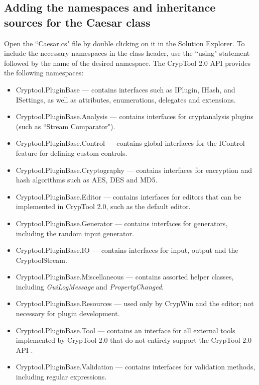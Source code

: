 \subsection{Adding the namespaces and inheritance sources for the Caesar class}
\label{sec:AddingTheNamespacesAndInheritanceSourcesForTheCaesarClass}

Open the ``Caesar.cs" file by double clicking on it in the Solution Explorer. To include the necessary namespaces in the class header, use the ``using" statement followed by the name of the desired namespace. The CrypTool 2.0 API provides the following namespaces:

\begin{itemize}
	\item Cryptool.PluginBase --- contains interfaces such as IPlugin, IHash, and ISettings, as well as attributes, enumerations, delegates and extensions.
	\item Cryptool.PluginBase.Analysis --- contains interfaces for cryptanalysis plugins (such as ``Stream Comparator").
	\item Cryptool.PluginBase.Control --- contains global interfaces for the IControl feature for defining custom controls.
	\item Cryptool.PluginBase.Cryptography --- contains interfaces for encryption and hash algorithms such as AES, DES and MD5.
	\item Cryptool.PluginBase.Editor --- contains interfaces for editors that can be implemented in CrypTool 2.0, such as the default editor.
	\item Cryptool.PluginBase.Generator --- contains interfaces for generators, including the random input generator.
	\item Cryptool.PluginBase.IO --- contains interfaces for input, output and the CryptoolStream.
	\item Cryptool.PluginBase.Miscellaneous --- contains assorted helper classes, including \textit{GuiLogMessage} and \textit{PropertyChanged}.
	\item Cryptool.PluginBase.Resources --- used only by CrypWin and the editor; not necessary for plugin development.
	\item Cryptool.PluginBase.Tool --- contains an interface for all external tools implemented by CrypTool 2.0 that do not entirely support the CrypTool 2.0 API .
	\item Cryptool.PluginBase.Validation --- contains interfaces for validation methods, including regular expressions.
\end{itemize}

